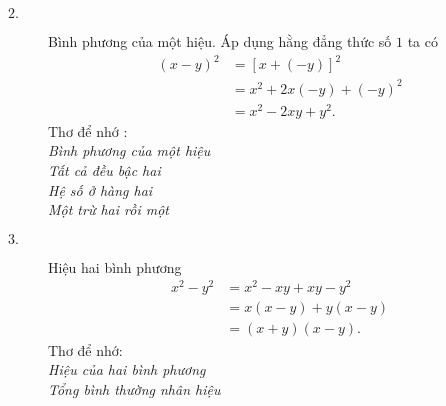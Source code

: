 \begin{description}
\begin{description}
            \item[$2.$] Bình phương của một hiệu. Áp dụng hằng đẳng thức số $1$ ta có
            \begin{equation*}
                \begin{split}
                (x-y)
                    ^2&=[x+(-y)]^2\\
                    &=x^2+2x(-y)+(-y)^2\\
                    &=x^2-2xy+y^2.
                \end{split}
            \end{equation*}
            Thơ để nhớ :\\
            \emph{Bình phương của một hiệu\\
            Tất cả đều bậc hai\\
            Hệ số ở hàng hai\\
            Một trừ hai rồi một}
            \item[$3.$] Hiệu hai bình phương
            \begin{equation*}
                \begin{split}
                    x^2-y^2&=x^2-xy+xy-y^2\\
                    &=x(x-y)+y(x-y)\\
                    &=(x+y)(x-y).
                \end{split}
            \end{equation*}
            Thơ để nhớ:\\
            \emph{Hiệu của hai bình phương\\
            Tổng bình thường nhân hiệu\\}


\end{description}
\end{description}
